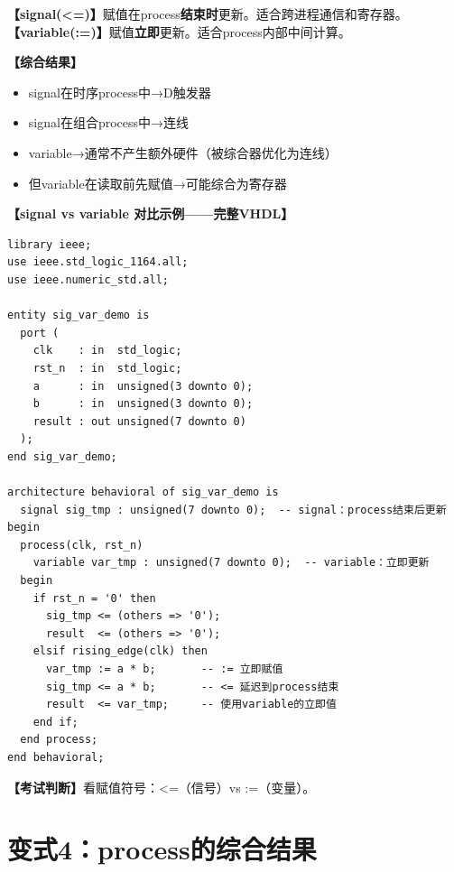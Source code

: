 \begin{detailbox}[完整教学]
\textbf{【signal(<=)】}赋值在process\textbf{结束时}更新。适合跨进程通信和寄存器。
\textbf{【variable(:=)】}赋值\textbf{立即}更新。适合process内部中间计算。

\textbf{【综合结果】}
\begin{itemize}
  \item signal在时序process中→D触发器
  \item signal在组合process中→连线
  \item variable→通常不产生额外硬件（被综合器优化为连线）
  \item 但variable在读取前先赋值→可能综合为寄存器
\end{itemize}

\textbf{【signal vs variable 对比示例——完整VHDL】}
\begin{lstlisting}[caption={signal（<=）与variable（:=）对比}]
library ieee;
use ieee.std_logic_1164.all;
use ieee.numeric_std.all;

entity sig_var_demo is
  port (
    clk    : in  std_logic;
    rst_n  : in  std_logic;
    a      : in  unsigned(3 downto 0);
    b      : in  unsigned(3 downto 0);
    result : out unsigned(7 downto 0)
  );
end sig_var_demo;

architecture behavioral of sig_var_demo is
  signal sig_tmp : unsigned(7 downto 0);  -- signal：process结束后更新
begin
  process(clk, rst_n)
    variable var_tmp : unsigned(7 downto 0);  -- variable：立即更新
  begin
    if rst_n = '0' then
      sig_tmp <= (others => '0');
      result  <= (others => '0');
    elsif rising_edge(clk) then
      var_tmp := a * b;       -- := 立即赋值
      sig_tmp <= a * b;       -- <= 延迟到process结束
      result  <= var_tmp;     -- 使用variable的立即值
    end if;
  end process;
end behavioral;
\end{lstlisting}

\textbf{【考试判断】}看赋值符号：<=（信号）vs :=（变量）。
\end{detailbox}


\section{变式4：process的综合结果}


